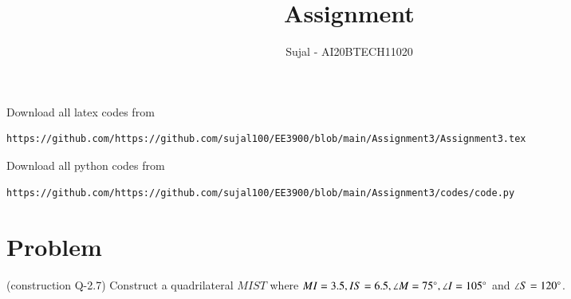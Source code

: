 \documentclass[journal,12pt,twocolumn]{IEEEtran}
\begin{document}
\let\StandardTheFigure\thefigure
\let\vec\mathbf
\renewcommand{\thefigure}{\theproblem}
\def\putbox#1#2#3{\makebox[0in][l]{\makebox[#1][l]{}\raisebox{\baselineskip}[0in][0in]{\raisebox{#2}[0in][0in]{#3}}}}
     \def\rightbox#1{\makebox[0in][r]{#1}}
     \def\centbox#1{\makebox[0in]{#1}}
     \def\topbox#1{\raisebox{-\baselineskip}[0in][0in]{#1}}
     \def\midbox#1{\raisebox{-0.5\baselineskip}[0in][0in]{#1}}
\vspace{3cm}
\title{Assignment }
\author{Sujal - AI20BTECH11020}
\maketitle
\newpage
\bigskip
\renewcommand{\thefigure}{\theenumi}
\renewcommand{\thetable}{\theenumi}
Download all latex codes from 

\begin{lstlisting}
https://github.com/https://github.com/sujal100/EE3900/blob/main/Assignment3/Assignment3.tex
\end{lstlisting}

Download all python codes from 

\begin{lstlisting}
https://github.com/https://github.com/sujal100/EE3900/blob/main/Assignment3/codes/code.py
\end{lstlisting}
\section{Problem}
(construction Q-2.7) Construct a quadrilateral $MIST$ where $MI = 3.5, IS = 6.5, \angle M = 75 \degree , \angle I = 105 \degree$ and $ \angle S = 120 \degree$.
\end{document}
